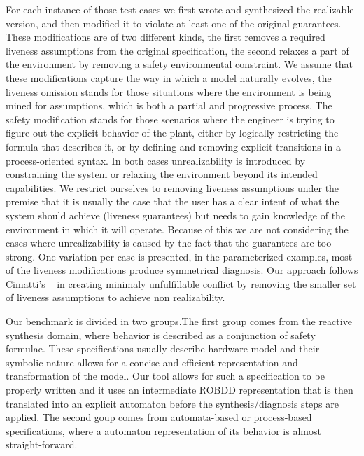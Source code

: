 For each instance of those test cases we first wrote and synthesized the realizable version, and then modified it
to violate at least one of the original guarantees. 
These modifications are of two different kinds, the first removes a required liveness assumptions from the original specification, the second relaxes a part of the environment by removing a safety environmental constraint. We assume that these modifications capture the way in which a model naturally evolves, the liveness omission stands for those situations where the environment is being mined for assumptions, which is both a partial and progressive process. The safety modification stands for those scenarios where the engineer is trying to figure out the explicit behavior of the plant, either by logically restricting the formula that describes it, or by defining and removing explicit transitions in a process-oriented syntax. In both cases unrealizability is introduced by constraining the system or relaxing the environment beyond its intended capabilities. We restrict ourselves to removing liveness assumptions under the premise that it is usually the case that the user has a clear intent of what the system should achieve (liveness guarantees) but needs to gain knowledge of the environment in which it will operate.  Because of this we are not considering the cases where unrealizability is caused by the fact that the guarantees are too strong. One variation per case is presented, in the parameterized examples, most of the liveness modifications produce symmetrical diagnosis. Our approach follows Cimatti's ~\cite{DBLP:conf/vmcai/CimattiRST08} in creating minimaly unfulfillable conflict by removing the smaller set of liveness assumptions to achieve non realizability.
 
Our benchmark is divided in two groups.The first group comes from the reactive synthesis domain, where behavior is described as a conjunction of safety formulae. These specifications usually describe hardware model and their symbolic nature allows for a concise and efficient representation and transformation of the model.  Our tool allows for such a specification to be properly written and it uses an intermediate ROBDD representation that is then translated into an explicit automaton before the synthesis/diagnosis steps are applied. The second goup comes from automata-based or process-based specifications, where a automaton representation of its behavior is almost straight-forward.

